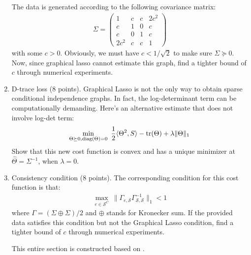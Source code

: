 \documentclass{article}
\begin{document}
\begin{enumerate}
The data is generated according to the following covariance matrix:
\begin{align}
\Sigma = \begin{pmatrix} 1& c& c& 2c^2 \\ c & 1 & 0&c\\c&0&1&c\\2c^2&c&c&1\end{pmatrix}
\end{align}
with some $ c > 0 $. 
Obviously, we must have $ c < 1 / \sqrt{2} $ to make sure $ \Sigma \succeq 0 $. 
Now, since graphical lasso cannot estimate this graph, find a tighter bound of $c$ through numerical experiments. 



\item 
D-trace loss (8 points). 
Graphical Lasso is not the only way to obtain sparse conditional independence graphs. 
In fact, the log-determinant term can be computationally demanding. 
Here's an alternative estimate that does not involve log-det term: 
\begin{align}
\min_{\Theta \succeq 0, \textnormal{diag}(\Theta) = 0} \ \frac{1}{2} \langle \Theta^2, S \rangle - \textnormal{tr} (\Theta) + \lambda \| \Theta \|_1
\end{align}
Show that this new cost function is convex and has a unique minimizer at $\widehat{\Theta} =\Sigma^{-1}$, when $ \lambda = 0 $. 


\item 
Consistency condition (8 points).
The corresponding condition for this cost function is that:
\begin{align}
\max_{e\in \mathcal{S}^C} \ \|\Gamma_{e, \mathcal{S}}\Gamma_{\mathcal{S}, \mathcal{S}}^{-1} \|_1 < 1
\end{align}
where $\Gamma = (\Sigma \oplus \Sigma) / 2$ and $\oplus$ stands for Kronecker sum. 
If the provided data satisfies this condition but not the Graphical Lasso condition, find a tighter bound of $c$ through numerical experiments. 

This entire section is constructed based on \citep{meinshausen2008note,ravikumar2011high,zhang2014sparse}.



\end{enumerate}














\newpage


\end{document}
